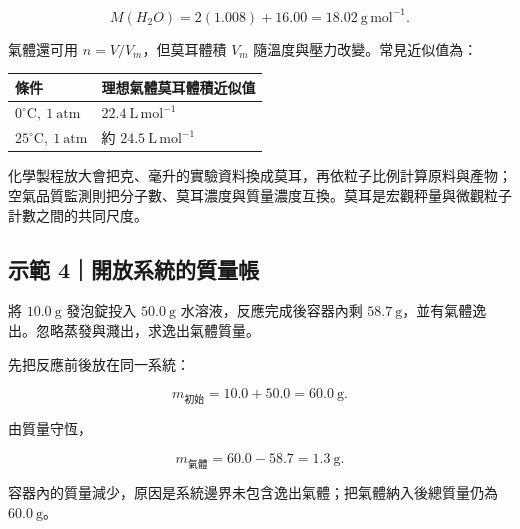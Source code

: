 \documentclass[11pt,a4paper]{article}
\newcounter{none}
\begin{document}
\[
M(H_2O)=2(1.008)+16.00=18.02\ \mathrm{g\,mol^{-1}}.
\]

氣體還可用 \(n=V/V_m\)，但莫耳體積 \(V_m\) 隨溫度與壓力改變。常見近似值為：

{\def\LTcaptype{none} %
\begin{longtable}[]{@{}
  >{\raggedright\arraybackslash}p{}
  >{\raggedleft\arraybackslash}p{}@{}}
\toprule\noalign{}
\begin{minipage}[b]{\linewidth}\raggedright
條件
\end{minipage} & \begin{minipage}[b]{\linewidth}\raggedleft
理想氣體莫耳體積近似值
\end{minipage} \\
\midrule\noalign{}
\endhead
\bottomrule\noalign{}
\endlastfoot
\(0^\circ\mathrm C,\ 1\ \mathrm{atm}\) & \(22.4\ \mathrm{L\,mol^{-1}}\) \\
\(25^\circ\mathrm C,\ 1\ \mathrm{atm}\) & 約 \(24.5\ \mathrm{L\,mol^{-1}}\) \\
\end{longtable}
}

化學製程放大會把克、毫升的實驗資料換成莫耳，再依粒子比例計算原料與產物；空氣品質監測則把分子數、莫耳濃度與質量濃度互換。莫耳是宏觀秤量與微觀粒子計數之間的共同尺度。

\begin{HandoutWorkedExample}

\subsection{示範 4｜開放系統的質量帳}\label{ux793aux7bc4-4ux958bux653eux7cfbux7d71ux7684ux8ceaux91cfux5e33}

將 \(10.0\ \mathrm g\) 發泡錠投入 \(50.0\ \mathrm g\) 水溶液，反應完成後容器內剩 \(58.7\ \mathrm g\)，並有氣體逸出。忽略蒸發與濺出，求逸出氣體質量。

先把反應前後放在同一系統：

\[
m_{\text{初始}}=10.0+50.0=60.0\ \mathrm g.
\]

由質量守恆，

\[
m_{\text{氣體}}=60.0-58.7=1.3\ \mathrm g.
\]

容器內的質量減少，原因是系統邊界未包含逸出氣體；把氣體納入後總質量仍為 \(60.0\ \mathrm g\)。

\end{HandoutWorkedExample}
\end{document}
